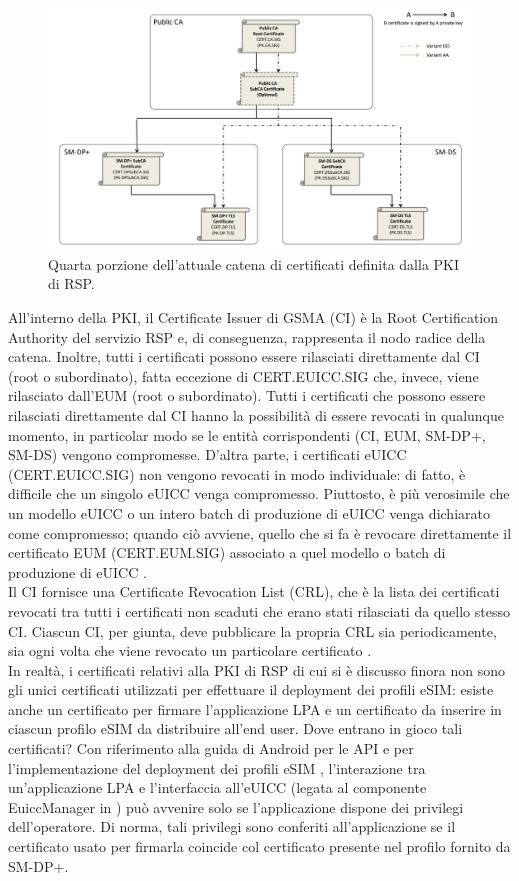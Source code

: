 \documentclass[10pt, oneside]{book}
\begin{document}
\begin{figure}
\includegraphics[width=\linewidth]{cert-chain-new4.png}
\caption{Quarta porzione dell'attuale catena di certificati definita dalla PKI di RSP.}
\label{fig:cert-chain-new4}
\end{figure}
All'interno della PKI, il Certificate Issuer di GSMA (CI) è la Root Certification Authority del servizio RSP e, di conseguenza, rappresenta il nodo radice della catena. Inoltre, tutti i certificati possono essere rilasciati direttamente dal CI (root o subordinato), fatta eccezione di CERT.EUICC.SIG che, invece, viene rilasciato dall'EUM (root o subordinato). Tutti i certificati che possono essere rilasciati direttamente dal CI hanno la possibilità di essere revocati in qualunque momento, in particolar modo se le entità corrispondenti (CI, EUM, SM-DP+, SM-DS) vengono compromesse. D'altra parte, i certificati eUICC (CERT.EUICC.SIG) non vengono revocati in modo individuale: di fatto, è difficile che un singolo eUICC venga compromesso. Piuttosto, è più verosimile che un modello eUICC o un intero batch di produzione di eUICC venga dichiarato come compromesso; quando ciò avviene, quello che si fa è revocare direttamente il certificato EUM (CERT.EUM.SIG) associato a quel modello o batch di produzione di eUICC \cite{GSMA-docs-new}.\\
Il CI fornisce una Certificate Revocation List (CRL), che è la lista dei certificati revocati tra tutti i certificati non scaduti che erano stati rilasciati da quello stesso CI. Ciascun CI, per giunta, deve pubblicare la propria CRL sia periodicamente, sia ogni volta che viene revocato un particolare certificato \cite{GSMA-docs-new}.\\
In realtà, i certificati relativi alla PKI di RSP di cui si è discusso finora non sono gli unici certificati utilizzati per effettuare il deployment dei profili eSIM: esiste anche un certificato per firmare l'applicazione LPA e un certificato da inserire in ciascun profilo eSIM da distribuire all'end user. Dove entrano in gioco tali certificati? Con riferimento alla guida di Android per le API e per l'implementazione del deployment dei profili eSIM \cite{Android-docs}, l'interazione tra un'applicazione LPA e l'interfaccia all'eUICC (legata al componente EuiccManager in \cite{Android-docs}) può avvenire solo se l'applicazione dispone dei privilegi dell'operatore. Di norma, tali privilegi sono conferiti all'applicazione se il certificato usato per firmarla coincide col certificato presente nel profilo fornito da SM-DP+.
\end{document}

